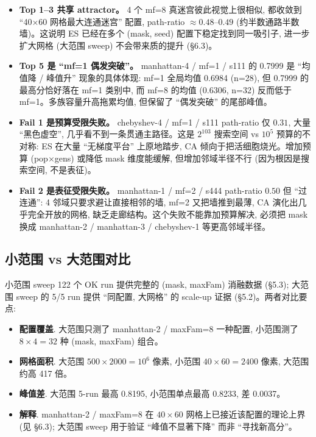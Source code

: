 \begin{itemize}[leftmargin=*, itemsep=0pt, topsep=0pt]
  \item \textbf{Top 1--3 共享 attractor。} 4 个 mf=8 真迷宫彼此视觉上很相似, 都收敛到 ``40$\times$60 网格最大连通迷宫'' 配置, path-ratio $\approx 0.48$--$0.49$ (约半数通路半数墙)。这说明 ES 已经在多个 (mask, seed) 配置下稳定找到同一吸引子, 进一步扩大网格 (大范围 sweep) 不会带来质的提升 (§6.3)。
  \item \textbf{Top 5 是 ``mf=1 偶发突破''。} manhattan-4 / mf=1 / s111 的 0.7999 是 ``均值降 / 峰值升'' 现象的具体体现: mf=1 全局均值 0.6984 (n=28), 但 0.7999 的最高分恰好落在 mf=1 类别中, 而 mf=8 的均值 (0.6306, n=32) 反而低于 mf=1。多族容量升高拖累均值, 但保留了 ``偶发突破'' 的尾部峰值。
  \item \textbf{Fail 1 是预算受限失败。} chebyshev-4 / mf=1 / s111 path-ratio 仅 $0.31$, 大量 ``黑色虚空'', 几乎看不到一条贯通主路径。这是 $2^{103}$ 搜索空间 vs $10^5$ 预算的不对称: ES 在大量 ``无梯度平台'' 上原地踏步, CA 倾向于把活细胞烧光。增加预算 (pop$\times$gens) 或降低 mask 维度能缓解, 但增加邻域半径不行 (因为根因是搜索空间, 不是表征)。
  \item \textbf{Fail 2 是表征受限失败。} manhattan-1 / mf=2 / s444 path-ratio $0.50$ 但 ``过连通'': 4 邻域只要求避让直接相邻的墙, mf=2 又把墙推到最薄, CA 演化出几乎完全开放的网格, 缺乏走廊结构。这个失败不能靠加预算解决, 必须把 mask 换成 manhattan-2 / manhattan-3 / chebyshev-1 等更高邻域半径。
\end{itemize}

\subsection{小范围 vs 大范围对比}

小范围 sweep 122 个 OK run 提供完整的 (mask, maxFam) 消融数据 (§5.3); 大范围 sweep 的 5/5 run 提供 ``同配置, 大网格'' 的 scale-up 证据 (§5.2)。两者对比要点:
\begin{itemize}[leftmargin=*, itemsep=0pt, topsep=0pt]
  \item \textbf{配置覆盖}. 大范围只测了 manhattan-2 / maxFam=8 一种配置, 小范围测了 $8 \times 4 = 32$ 种 (mask, maxFam) 组合。
  \item \textbf{网格面积}. 大范围 $500 \times 2000 = 10^6$ 像素, 小范围 $40 \times 60 = 2400$ 像素, 大范围约高 417 倍。
  \item \textbf{峰值差}. 大范围 5-run 最高 0.8195, 小范围单点最高 0.8233, 差 0.0037。
  \item \textbf{解释}. manhattan-2 / maxFam=8 在 $40 \times 60$ 网格上已接近该配置的理论上界 (见 §6.3); 大范围 sweep 用于验证 ``峰值不显著下降'' 而非 ``寻找新高分''。
\end{itemize}


